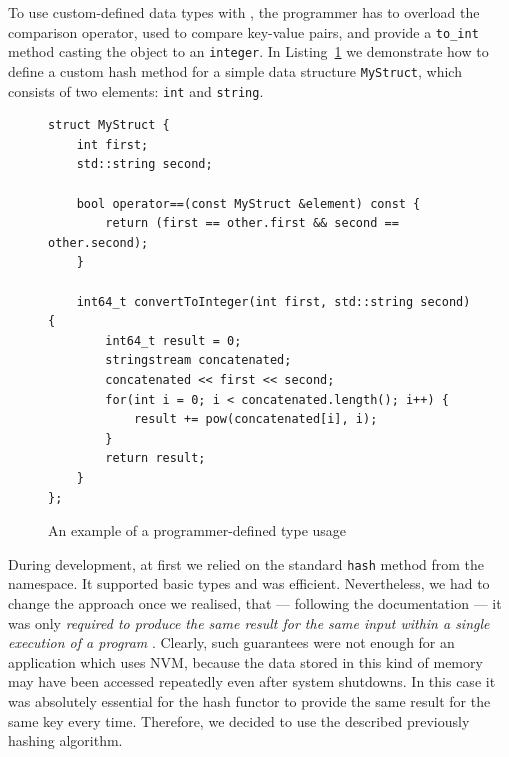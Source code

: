     To use custom-defined data types with \NvmHashMap, the programmer has to overload the comparison operator, used to compare key-value pairs, and provide a \texttt{to\_int} method casting the object to an \texttt{integer}. 
    In Listing~\ref{StdHashOverload} we demonstrate how to define a custom hash method for a simple data structure \texttt{MyStruct}, which consists of two elements: \texttt{int} and \texttt{string}. 
    
\begin{figure}[ht]
\renewcommand{\figurename}{Listing}
\begin{lstlisting}
struct MyStruct {
    int first;
    std::string second;
    
    bool operator==(const MyStruct &element) const {
        return (first == other.first && second == other.second);
    }
    
    int64_t convertToInteger(int first, std::string second) {
        int64_t result = 0;
        stringstream concatenated;
        concatenated << first << second;
        for(int i = 0; i < concatenated.length(); i++) {
            result += pow(concatenated[i], i);
        }
        return result;
    }
};
\end{lstlisting}
\caption{An example of a programmer-defined type usage}
\label{StdHashOverload}
\end{figure}

    During development, at first we relied on the standard \texttt{hash} method from the \std namespace. 
    It supported basic \std types and was efficient.
    Nevertheless, we had to change the approach once we realised, that --- following the documentation --- it was only \textit{required to produce the same result for the same input within a single execution of a program} \cite{StdHash}.
    Clearly, such guarantees were not enough for an application which uses NVM, because the data stored in this kind of memory may have been accessed repeatedly even after system shutdowns.
    In this case it was absolutely essential for the hash functor to provide the same result for the same key every time.    
    Therefore, we decided to use the described previously hashing algorithm.

\subsection{\internalHashMap}

